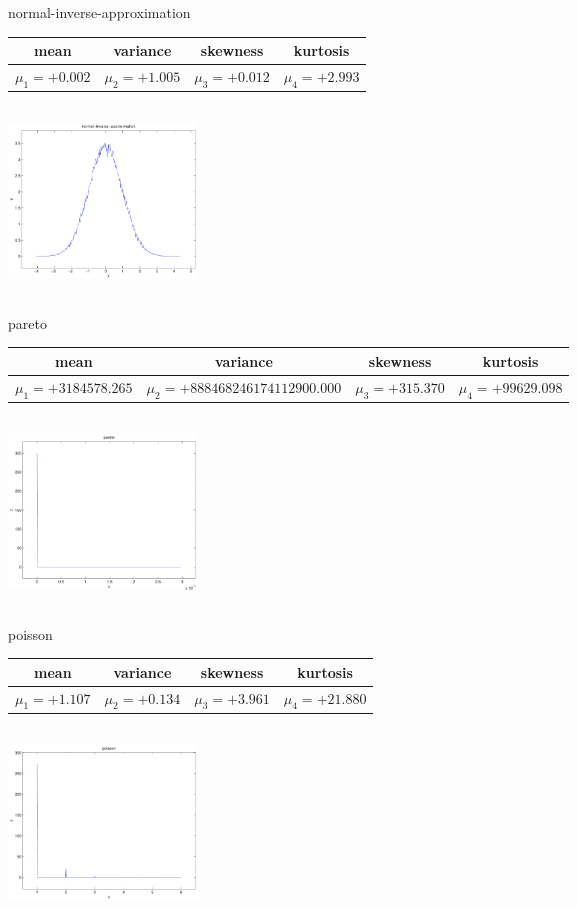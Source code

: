 \documentclass[12pt]{article}
\theoremstyle{definition}
\theoremstyle{remark}
\numberwithin{equation}{section}
\begin{document}
\newpage
normal-inverse-approximation \begin{tabular}{|c|c|c|c|}  mean & variance & skewness & kurtosis \\  \hline
$\mu_1 = +0.002$ & $\mu_2 = +1.005$ & $\mu_3 = +0.012$ & $\mu_4 =+2.993$ \\
\end{tabular}

\includegraphics[width=5cm,height=5cm]{normal-inverse-approximation.pdf}

pareto \begin{tabular}{|c|c|c|c|}  mean & variance & skewness & kurtosis \\  \hline
$\mu_1 = +3184578.265$ & $\mu_2 = +888468246174112900.000$ & $\mu_3 = +315.370$ & $\mu_4 =+99629.098$ \\
\end{tabular}

\includegraphics[width=5cm,height=5cm]{pareto.pdf}

poisson \begin{tabular}{|c|c|c|c|}  mean & variance & skewness & kurtosis \\  \hline
$\mu_1 = +1.107$ & $\mu_2 = +0.134$ & $\mu_3 = +3.961$ & $\mu_4 =+21.880$ \\
\end{tabular}

\includegraphics[width=5cm,height=5cm]{poisson.pdf}
\end{document}
